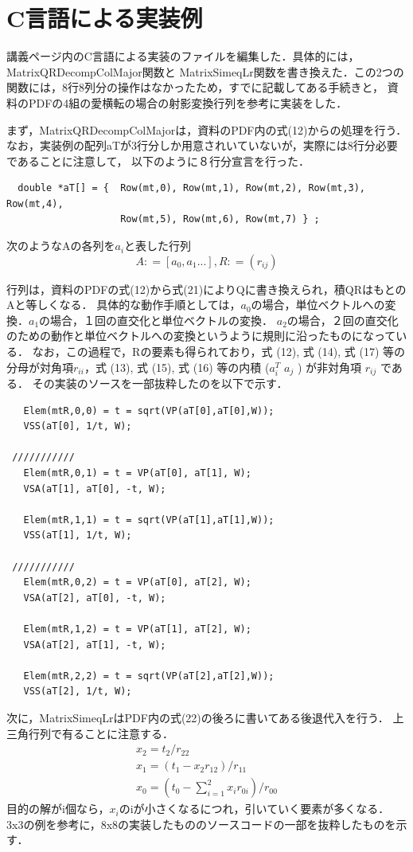 \documentclass[11pt]{jarticle}
\begin{document}
\section{C言語による実装例}
講義ページ内のC言語による実装のファイルを編集した．具体的には，MatrixQRDecompColMajor関数と
MatrixSimeqLr関数を書き換えた．この2つの関数には，8行8列分の操作はなかったため，すでに記載してある手続きと，
資料のPDFの4組の愛横転の場合の射影変換行列を参考に実装をした．

まず，MatrixQRDecompColMajorは，資料のPDF内の式(12)からの処理を行う． 
なお，実装例の配列aTが3行分しか用意されいていないが，実際には8行分必要であることに注意して，
以下のように８行分宣言を行った．
\begin{verbatim}
  double *aT[] = {  Row(mt,0), Row(mt,1), Row(mt,2), Row(mt,3), Row(mt,4), 
                    Row(mt,5), Row(mt,6), Row(mt,7) } ;
\end{verbatim}
次のようなAの各列を$a_{i}$と表した行列
\begin{equation}
  A \colon = [a_{0}, a_{1}...], R \colon = (r_{ij})
\end{equation}


行列は，資料のPDFの式(12)から式(21)によりQに書き換えられ，積QRはもとのAと等しくなる．
具体的な動作手順としては，$a_0$の場合，単位ベクトルへの変換．$a_1$の場合，１回の直交化と単位ベクトルの変換．
$a_2$の場合，２回の直交化のための動作と単位ベクトルへの変換というように規則に沿ったものになっている．
なお，この過程で，Rの要素も得られており，式 (12), 式 (14), 式 (17) 等の分母が対角項$r_{ii}$，式 (13),
式 (15), 式 (16) 等の内積 ($a^{T}_{i}$ $a_j$ ) が非対角項 $r_{ij}$ である．
その実装のソースを一部抜粋したのを以下で示す．

\begin{verbatim}
   Elem(mtR,0,0) = t = sqrt(VP(aT[0],aT[0],W));
   VSS(aT[0], 1/t, W);

 ///////////
   Elem(mtR,0,1) = t = VP(aT[0], aT[1], W);
   VSA(aT[1], aT[0], -t, W);

   Elem(mtR,1,1) = t = sqrt(VP(aT[1],aT[1],W));
   VSS(aT[1], 1/t, W);

 ///////////
   Elem(mtR,0,2) = t = VP(aT[0], aT[2], W);
   VSA(aT[2], aT[0], -t, W);

   Elem(mtR,1,2) = t = VP(aT[1], aT[2], W);
   VSA(aT[2], aT[1], -t, W);

   Elem(mtR,2,2) = t = sqrt(VP(aT[2],aT[2],W));
   VSS(aT[2], 1/t, W);
\end{verbatim}

次に，MatrixSimeqLrはPDF内の式(22)の後ろに書いてある後退代入を行う．
上三角行列で有ることに注意する．
\begin{eqnarray}
  x_2 = t_2 / r_{22}\\
  x_1 = (t_1 - x_2 r_12)/r_{11}\\
  x_0 = (t_0 - \sum_{i=1}^{2} x_i r_{0i})/r_{00}
\end{eqnarray}
目的の解がi個なら，$x_{i}$のiが小さくなるにつれ，引いていく要素が多くなる．
3x3の例を参考に，8x8の実装したもののソースコードの一部を抜粋したものを示す．
\end{document}
